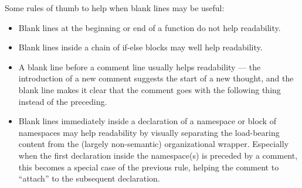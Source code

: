     Some rules of thumb to help when blank lines may be useful:
    \begin{itemize}
        \item Blank lines at the beginning or end of a function do not help readability.
        \item Blank lines inside a chain of if-else blocks may well help readability.
        \item A blank line before a comment line usually helps readability — the introduction of a new comment suggests the start of a new thought, and the blank line makes it clear that the comment goes with the following thing instead of the preceding.
        \item Blank lines immediately inside a declaration of a namespace or block of namespaces may help readability by visually separating the load-bearing content from the (largely non-semantic) organizational wrapper. Especially when the first declaration inside the namespace(s) is preceded by a comment, this becomes a special case of the previous rule, helping the comment to \enquote{attach} to the subsequent declaration.
    \end{itemize}
